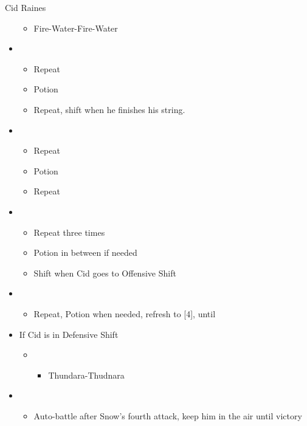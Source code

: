 \begin{multicols}{2}
\begin{battle}{Cid Raines}
\begin{itemize}
\begin{itemize}
        \item Fire-Water-Fire-Water
    \end{itemize}
    \item \third
    \begin{itemize}
        \item Repeat
        \item Potion
        \item Repeat, shift when he finishes his string.
    \end{itemize}
    \item \fifth
    \begin{itemize}
        \item Repeat
        \item Potion
        \item Repeat
    \end{itemize}
    \item \second
    \begin{itemize}
        \item Repeat three times
        \item Potion in between if needed
        \item Shift when Cid goes to Offensive Shift
    \end{itemize}
    \item \third
    \begin{itemize}
        \item Repeat, Potion when needed, refresh to [4], until \stagger
    \end{itemize}
    \item If Cid is in Defensive Shift
    \begin{itemize}
        \item \second
        \begin{itemize}
            \item Thundara-Thudnara
        \end{itemize}
    \end{itemize}
    \item \sixth
    \begin{itemize}
        \item Auto-battle after Snow's fourth attack, keep him in the air until victory
    \end{itemize}
\end{itemize}
\end{battle}

\begin{menu}


\end{menu}
\end{multicols}
